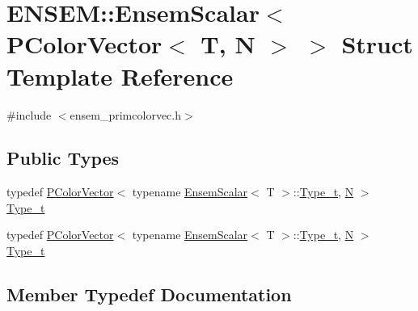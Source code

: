 \hypertarget{structENSEM_1_1EnsemScalar_3_01PColorVector_3_01T_00_01N_01_4_01_4}{}\section{E\+N\+S\+EM\+:\+:Ensem\+Scalar$<$ P\+Color\+Vector$<$ T, N $>$ $>$ Struct Template Reference}
\label{structENSEM_1_1EnsemScalar_3_01PColorVector_3_01T_00_01N_01_4_01_4}


{\ttfamily \#include $<$ensem\+\_\+primcolorvec.\+h$>$}

\subsection*{Public Types}
\begin{DoxyCompactItemize}
\item 
typedef \mbox{\hyperlink{classENSEM_1_1PColorVector}{P\+Color\+Vector}}$<$ typename \mbox{\hyperlink{structENSEM_1_1EnsemScalar}{Ensem\+Scalar}}$<$ T $>$\+::\mbox{\hyperlink{structENSEM_1_1EnsemScalar_3_01PColorVector_3_01T_00_01N_01_4_01_4_a7a37dbe2ba322ec20fb55d0359c3f149}{Type\+\_\+t}}, \mbox{\hyperlink{operator__name__util_8cc_a7722c8ecbb62d99aee7ce68b1752f337}{N}} $>$ \mbox{\hyperlink{structENSEM_1_1EnsemScalar_3_01PColorVector_3_01T_00_01N_01_4_01_4_a7a37dbe2ba322ec20fb55d0359c3f149}{Type\+\_\+t}}
\item 
typedef \mbox{\hyperlink{classENSEM_1_1PColorVector}{P\+Color\+Vector}}$<$ typename \mbox{\hyperlink{structENSEM_1_1EnsemScalar}{Ensem\+Scalar}}$<$ T $>$\+::\mbox{\hyperlink{structENSEM_1_1EnsemScalar_3_01PColorVector_3_01T_00_01N_01_4_01_4_a7a37dbe2ba322ec20fb55d0359c3f149}{Type\+\_\+t}}, \mbox{\hyperlink{operator__name__util_8cc_a7722c8ecbb62d99aee7ce68b1752f337}{N}} $>$ \mbox{\hyperlink{structENSEM_1_1EnsemScalar_3_01PColorVector_3_01T_00_01N_01_4_01_4_a7a37dbe2ba322ec20fb55d0359c3f149}{Type\+\_\+t}}
\end{DoxyCompactItemize}


\subsection{Member Typedef Documentation}
\mbox{\label{structENSEM_1_1EnsemScalar_3_01PColorVector_3_01T_00_01N_01_4_01_4_a7a37dbe2ba322ec20fb55d0359c3f149}} 
